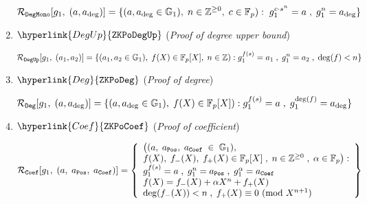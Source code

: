 \documentclass[11pt, lettersize, notitlepage, leqno, footskip=0.6cm]{article}
\newcommand{\bz}{\mathbb Z}
\newcommand{\bFp}{\mathbb{F}_p}
\newcommand{\mc}{\mathcal}
\newcommand{\mb}{\mathbb}
\newcommand{\al}{\alpha}
\newcommand{\vs}{\vspace{-0.15cm}}
\newcommand{\Mod}[1]{\ (\mathrm{mod}\ #1)}
\numberwithin{equation}{section}
\begin{document}
\begin{enumerate}[wide, labelwidth=!, labelindent=0pt, itemsep=-0.2ex]
\vs $$\mc{R}_{\tt{DegMono}}[g_1,\;(a, a_{\deg})] = \{
(a,a_{\deg} \in \mb{G}_1),\; n\in \bz^{\geq 0},\;c\in \bFp):\; g_1^{c\cdot s^n} = a\;,\; g_1^{n} = a_{\deg} \}  $$


\item $\hyperlink{DegUp}{\tt{ZKPoDegUp}}$ (\textit{Proof of degree upper bound}) \vspace{-3mm}

$$\mc{R}_{\tt{DegUp}}[g_1,\;(a_1,a_2)] = \{(a_1,a_2\in\mb{G}_1),\; f(X)\in \bFp[X],\; n\in \bz): g_1^{f(s)} = a_1\;,\; g_1^{n} = a_2\;,\;\deg(f)< n\} \vs $$




\item $\hyperlink{Deg}{\tt{ZKPoDeg}}$ (\textit{Proof of degree}) \vspace{-3mm}

$$\mc{R}_{\tt{Deg}}[g_1,\;(a,a_{\deg})] = \{(a,a_{\deg}\in\mb{G}_1),\; f(X)\in \bFp[X]): g_1^{f(s)} = a\;,\; g_1^{\deg(f)} = a_{\deg}\} \vs $$

\item $\hyperlink{Coef}{\tt{ZKPoCoef}}$ (\textit{Proof of coefficient}) \vspace{-3mm}

$$\mc{R}_{\tt{Coef}}[g_1,\;(a,\;a_{\tt{Pos}},\;a_{\tt{Coef}})] = \left\{\begin{array}{l} 
\big((a,\;a_{\tt{Pos}},\;a_{\tt{Coef}}\;\in\;\mb{G}_1),\\ f(X),\; f_{-}(X),\; f_{+}(X)\in \bFp[X]\;,\;n\in \bz^{\geq 0}\;,\;\al \in \bFp \big):\\ g_1^{f(s)} = a\;,\; g_1^{n} = a_{\tt{Pos}}\;,\; g_1^{\al} = a_{\tt{Coef}}  
\\ f(X) = f_{-}(X) + \al X^n + f_{+}(X)\\
\deg(f_{-}(X)) < n\;,\; f_{+}(X)\equiv 0 \Mod{X^{n+1}} \end{array}\right\} \vs $$ 




\begin{comment} \item $\hyperlink{DotProd}{\tt{ZKPoDotProd}}$ (\textit{Proof of dot product}) \vspace{-3mm}

 $$\mc{R}_{\tt{DotProd}}[g_1,\;(a_1,a_2),\;a_{1,2}] = \left\{\begin{array}{l} (a_1,a_2\in\mb{G}_1),\; f_1(X),\; f_2(X)\;\in\; \bFp[X]):\\ g_1^{f_1(s)} = a_1\;,\; g_1^{f_2(s)} = a_2\;,\; g_1^{f_1\;\circ\;f_2} = a_{1,2}\end{array} \right\} \vs $$


\end{comment}
\end{enumerate}
\end{document}
